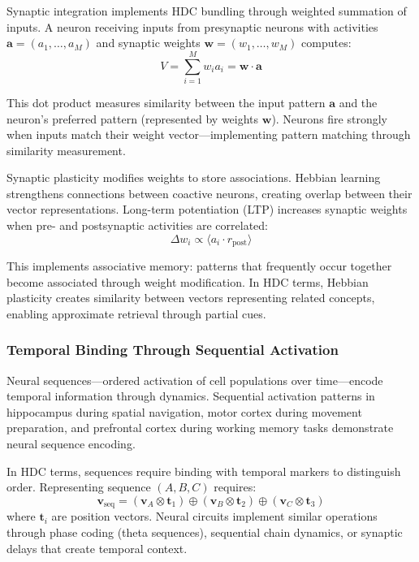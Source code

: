 \documentclass[12pt]{article}
\begin{document}
Synaptic integration implements HDC bundling through weighted summation of inputs. A neuron receiving inputs from presynaptic neurons with activities $\mathbf{a} = (a_1, \ldots, a_M)$ and synaptic weights $\mathbf{w} = (w_1, \ldots, w_M)$ computes:
\begin{equation}
V = \sum_{i=1}^M w_i a_i = \mathbf{w} \cdot \mathbf{a}
\end{equation}

This dot product measures similarity between the input pattern $\mathbf{a}$ and the neuron's preferred pattern (represented by weights $\mathbf{w}$). Neurons fire strongly when inputs match their weight vector—implementing pattern matching through similarity measurement.

Synaptic plasticity modifies weights to store associations. Hebbian learning strengthens connections between coactive neurons, creating overlap between their vector representations. Long-term potentiation (LTP) increases synaptic weights when pre- and postsynaptic activities are correlated:
\begin{equation}
\Delta w_i \propto \langle a_i \cdot r_{\text{post}} \rangle
\end{equation}

This implements associative memory: patterns that frequently occur together become associated through weight modification. In HDC terms, Hebbian plasticity creates similarity between vectors representing related concepts, enabling approximate retrieval through partial cues.

\subsubsection{Temporal Binding Through Sequential Activation}

Neural sequences—ordered activation of cell populations over time—encode temporal information through dynamics. Sequential activation patterns in hippocampus during spatial navigation, motor cortex during movement preparation, and prefrontal cortex during working memory tasks demonstrate neural sequence encoding.

In HDC terms, sequences require binding with temporal markers to distinguish order. Representing sequence $(A, B, C)$ requires:
\begin{equation}
\mathbf{v}_{\text{seq}} = (\mathbf{v}_A \otimes \mathbf{t}_1) \oplus (\mathbf{v}_B \otimes \mathbf{t}_2) \oplus (\mathbf{v}_C \otimes \mathbf{t}_3)
\end{equation}
where $\mathbf{t}_i$ are position vectors. Neural circuits implement similar operations through phase coding (theta sequences), sequential chain dynamics, or synaptic delays that create temporal context.
\end{document}
